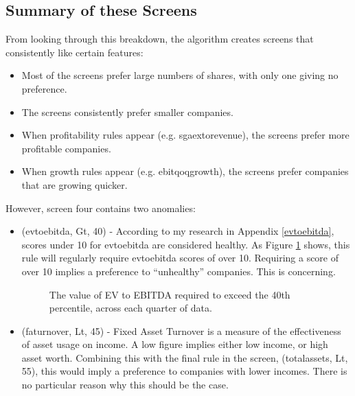 \subsection{Summary of these Screens}
From looking through this breakdown, the algorithm creates screens that consistently like certain features:
\begin{itemize}
    \item Most of the screens prefer large numbers of shares, with only one giving no preference.
    \item The screens consistently prefer smaller companies.
    \item When profitability rules appear (e.g. sgaextorevenue), the screens prefer more profitable companies.
    \item When growth rules appear (e.g. ebitqoqgrowth), the screens prefer companies that are growing quicker.
\end{itemize}

\noindent However, screen four contains two anomalies:
\begin{itemize}
    \item (evtoebitda, Gt, 40) - According to my research in Appendix \ref{evtoebitda}, scores under 10 for evtoebitda are considered healthy. As Figure \ref{fig:ev} shows, this rule will regularly require evtoebitda scores of over 10. Requiring a score of over 10 implies a preference to ``unhealthy'' companies. This is concerning.
    
    \begin{figure}[h]
        \centering
        \caption{The value of EV to EBITDA required to exceed the 40th percentile, across each quarter of data.}
        \label{fig:ev}
    \end{figure}
    
    \item (faturnover, Lt, 45) - Fixed Asset Turnover is a measure of the effectiveness of asset usage on income. A low figure implies either low income, or high asset worth. Combining this with the final rule in the screen, (totalassets, Lt, 55), this would imply a preference to companies with lower incomes. There is no particular reason why this should be the case.
\end{itemize}

